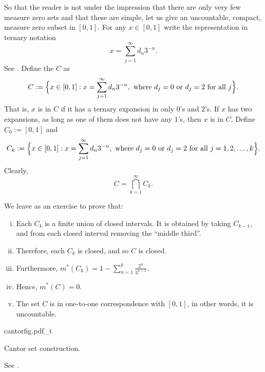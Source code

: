 \begin{example} \label{example:cantor}
So that the reader is not under the impression that there are only very few
measure zero sets and that these are simple,
let us give an uncountable, compact, measure zero subset in $[0,1]$.
For any $x \in [0,1]$ write the
representation in ternary notation
\begin{equation*}
x = \sum_{j=1}^\infty d_n 3^{-n} .
\end{equation*}
See .
Define the \emph{} $C$ as
\begin{equation*}
C := \Bigl\{ x \in [0,1] : x = \sum_{j=1}^\infty d_n 3^{-n}, \text{ where $d_j =
0$ or $d_j = 2$ for all $j$} \Bigr\} .
\end{equation*}
That is, $x$ is in $C$ if it has a ternary expansion in only $0$'s and
$2$'s.  If $x$ has two expansions, as long as one of them does not have any
$1$'s, then $x$ is in $C$.
Define $C_0 := [0,1]$ and
\begin{equation*}
C_k := \Bigl\{ x \in [0,1] : x = \sum_{j=1}^\infty d_n 3^{-n}, \text{ where $d_j =
0$ or $d_j = 2$ for all $j=1,2,\ldots,k$} \Bigr\} .
\end{equation*}
Clearly,
\begin{equation*}
C = \bigcap_{k=1}^\infty C_k .
\end{equation*}

\pagebreak[2]
We leave as an exercise to prove that:
\begin{enumerate}[(i)]
\item Each $C_k$ is a finite union of closed intervals.  It is obtained by
taking $C_{k-1}$, and from each closed interval removing the ``middle
third''.
\item Therefore, each $C_k$ is closed, and so $C$ is closed.
\item Furthermore,
$m^*(C_k) =1 - \sum_{n=1}^k \frac{2^n}{3^{n+1}}$.
\item Hence,
$m^*(C) = 0$.
\item The set $C$ is in one-to-one correspondence with $[0,1]$, in other
words, it is
uncountable.
\end{enumerate}
\begin{myfigureht}
{cantorfig.pdf_t}
\caption{Cantor set construction.\label{fig:cantor}}
\end{myfigureht}
See .
\end{example}


